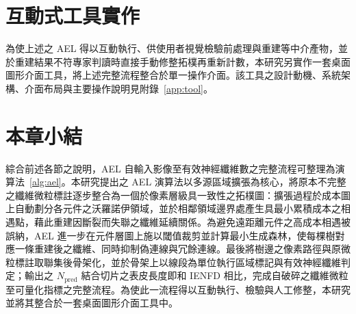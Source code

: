 \section{互動式工具實作}
\label{sec:tool-note}

為使上述之 AEL 得以互動執行、供使用者視覺檢驗前處理與重建等中介產物，並於重建結果不符專家判讀時直接手動修整拓樸再重新計數，本研究另實作一套桌面圖形介面工具，將上述完整流程整合於單一操作介面。該工具之設計動機、系統架構、介面布局與主要操作說明見附錄~\ref{app:tool}。

\section{本章小結}
\label{sec:method-summary}

綜合前述各節之說明，AEL 自輸入影像至有效神經纖維數之完整流程可整理為演算法~\ref{alg:ael}。本研究提出之 AEL 演算法以多源區域擴張為核心，將原本不完整之纖維微粒標註逐步整合為一個於像素層級具一致性之拓樸圖：擴張過程於成本圖上自動劃分各元件之沃羅諾伊領域，並於相鄰領域邊界處產生具最小累積成本之相遇點，藉此重建因斷裂而失聯之纖維延續關係。為避免遠距離元件之高成本相遇被誤納，AEL 進一步在元件層圖上施以閾值裁剪並計算最小生成森林，使每棵樹對應一條重建後之纖維、同時抑制偽連線與冗餘連線。最後將樹邊之像素路徑與原微粒標註取聯集後骨架化，並於骨架上以線段為單位執行區域標記與有效神經纖維判定；輸出之 $N_{\text{pred}}$ 結合切片之表皮長度即和 IENFD 相比，完成自破碎之纖維微粒至可量化指標之完整流程。為使此一流程得以互動執行、檢驗與人工修整，本研究並將其整合於一套桌面圖形介面工具中。


